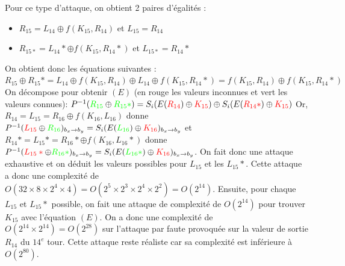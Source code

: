 \documentclass[11pt]{article}
\begin{document}
Pour ce type d'attaque, on obtient 2 paires d'égalités : 

\begin{itemize}
	\item $R_{15}=L_{14} \oplus f(K_{15}, R_{14})$ et $L_{15}=R_{14}$
	\item $R_{15*}=L_{14}* \oplus f(K_{15}, R_{14}*)$ et $L_{15*}=R_{14}*$
\end{itemize}

On obtient donc les équations suivantes : \newline
$R_{15} \oplus R_{15}* = L_{14} \oplus f(K_{15}, R_{14}) \oplus L_{14} \oplus f(K_{15}, R_{14}*)= f(K_{15}, R_{14}) \oplus f(K_{15}, R_{14}*)$ \newline \newline
On décompose pour obtenir $(E)$ (en rouge les valeurs inconnues et vert les valeurs connues): \newline
$P^{-1}(\color{green}R_{15}\color{black}\oplus\color{green}R_{15}*\color{black})=S_{i}(E(\color{red}R_{14}\color{black})\oplus \color{red}K_{15}\color{black})\oplus S_{i}(E(\color{red}R_{14}*\color{black})\oplus \color{red}K_{15}\color{black})$ \newline \newline
Or, $R_{14}=L_{15}=R_{16} \oplus f(K_{16}, L_{16})$ donne $P^{-1}(\color{red}L_{15}\color{black} \oplus \color{green}R_{16}\color{black})_{b_{x}\to b_{y}}=S_i(E(\color{green}L_{16}\color{black}) \oplus \color{red}K_{16}\color{black})_{b_{x}\to b_{y}}$ et \newline
$R_{14}*=L_{15}*=R_{16}* \oplus f(K_{16}, L_{16}*)$ donne $P^{-1}(\color{red}L_{15}*\color{black} \oplus \color{green}R_{16}*\color{black})_{b_{x}\to b_{y}}=S_i(E(\color{green}L_{16}*\color{black}) \oplus \color{red}K_{16}\color{black})_{b_{x}\to b_{y}}$. \newline 
On fait donc une attaque exhaustive et on déduit les valeurs possibles pour $L_{15}$ et les $L_{15}*$. Cette attaque a donc une complexité de $O(32 \times 8 \times 2^4 \times 4)=O(2^5 \times 2^3 \times 2^4 \times 2^2)=O(2^{14})$. \newline \newline
Ensuite, pour chaque $L_{15}$ et $L_{15}*$ possible, on fait une attaque de complexité de $O(2^{14})$ pour trouver $K_{15}$ avec l'équation $(E)$. \newline
On a donc une complexité de $O(2^{14} \times 2^{14})=O(2^{28})$ sur l'attaque par faute provoquée sur la valeur de sortie $R_{14}$ du $14^{e}$ tour. Cette attaque reste réaliste car sa complexité est inférieure à $O(2^{80})$.
\end{document}
